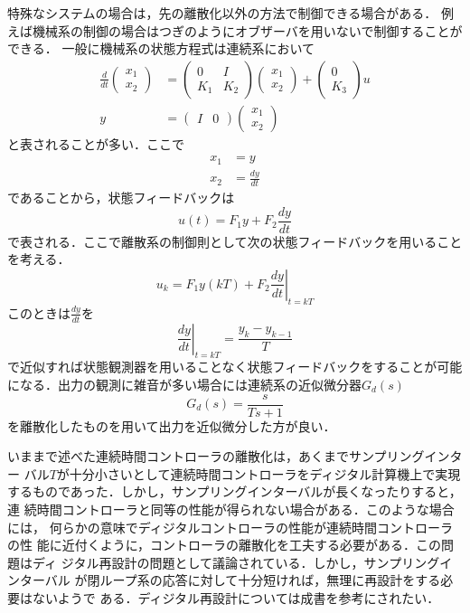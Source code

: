 特殊なシステムの場合は，先の離散化以外の方法で制御できる場合がある．
例えば機械系の制御の場合はつぎのようにオブザーバを用いないで制御することができる．
一般に機械系の状態方程式は連続系において
\begin{align}
 \frac{d}{dt}
  \left(\begin{array}{c}
         x_1 \\
	 x_2 
	\end{array}\right)
  &=
  \left(\begin{array}{cc}
         0   & I \\
	 K_1 & K_2
	\end{array}\right)
  \left(\begin{array}{c}
         x_1 \\
	 x_2 
	\end{array}\right)
  +
  \left(\begin{array}{c}
         0 \\
	 K_3
	\end{array}\right)
  u \\
 y &=
  \left(\begin{array}{cc}
         I & 0 
	\end{array}\right)
  \left(\begin{array}{c}
         x_1 \\
	 x_2 
	\end{array}\right)
\end{align}
と表されることが多い．ここで
\begin{align}
 x_1 &= y \\
 x_2 &= \frac{dy}{dt}
\end{align}
であることから，状態フィードバックは
\begin{equation}
 u(t) = F_1 y + F_2 \frac{dy}{dt}
\end{equation}
で表される．ここで離散系の制御則として次の状態フィードバックを用いること
を考える．
\begin{equation}
 u_k = F_1 y(kT) + F_2 \left.\frac{dy}{dt} \right\vert_{t = kT}
\end{equation}
このときは$\frac{dy}{dt}$を
\begin{equation}
 \left.\frac{dy}{dt}\right\vert_{t = kT} = \frac{y_k - y_{k-1}}{T}
\end{equation}
で近似すれば状態観測器を用いることなく状態フィードバックをすることが可能
になる．出力の観測に雑音が多い場合には連続系の近似微分器$G_d(s)$
\begin{equation}
 G_d(s) = \frac{s}{Ts + 1}
\end{equation}
を離散化したものを用いて出力を近似微分した方が良い．

いままで述べた連続時間コントローラの離散化は，あくまでサンプリングインター
バル$T$が十分小さいとして連続時間コントローラをディジタル計算機上で実現
するものであった．しかし，サンプリングインターバルが長くなったりすると，連
続時間コントローラと同等の性能が得られない場合がある．このような場合には，
何らかの意味でディジタルコントローラの性能が連続時間コントローラの性
能に近付くように，コントローラの離散化を工夫する必要がある．この問題はディ
ジタル再設計の問題として議論されている．しかし，サンプリングインターバル
が閉ループ系の応答に対して十分短ければ，無理に再設計をする必要はないようで
ある．ディジタル再設計については成書を参考にされたい．
